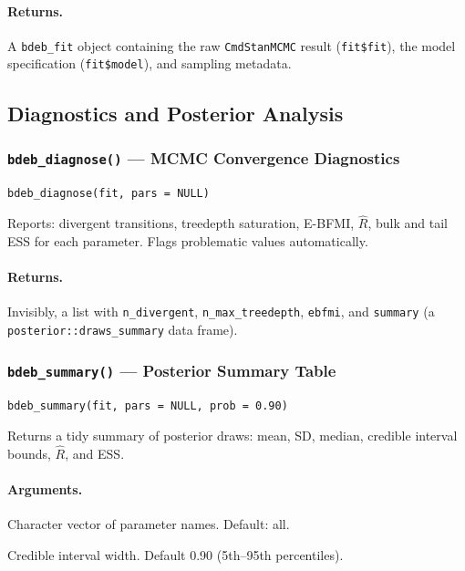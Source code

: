 \documentclass[11pt,a4paper]{article}
\newcommand{\fn}[1]{\texttt{#1()}}
\newcommand{\code}[1]{\texttt{#1}}
\begin{document}
\paragraph{Returns.} A \code{bdeb\_fit} object containing the raw
\code{CmdStanMCMC} result (\code{fit\$fit}), the model specification
(\code{fit\$model}), and sampling metadata.

\subsection{Diagnostics and Posterior Analysis}

\subsubsection{\fn{bdeb\_diagnose} --- MCMC Convergence Diagnostics}

\begin{lstlisting}
bdeb_diagnose(fit, pars = NULL)
\end{lstlisting}

Reports: divergent transitions, treedepth saturation, E-BFMI, $\hat{R}$,
bulk and tail ESS for each parameter.  Flags problematic values
automatically.

\paragraph{Returns.} Invisibly, a list with \code{n\_divergent},
\code{n\_max\_treedepth}, \code{ebfmi}, and \code{summary} (a
\code{posterior::draws\_summary} data frame).

\subsubsection{\fn{bdeb\_summary} --- Posterior Summary Table}

\begin{lstlisting}
bdeb_summary(fit, pars = NULL, prob = 0.90)
\end{lstlisting}

Returns a tidy summary of posterior draws: mean, SD, median, credible
interval bounds, $\hat{R}$, and ESS.

\paragraph{Arguments.}
\begin{description}[nosep,leftmargin=2.5cm]
  \item[\code{pars}] Character vector of parameter names.  Default: all.
  \item[\code{prob}] Credible interval width.  Default 0.90 (5th--95th percentiles).
\end{description}
\end{document}
